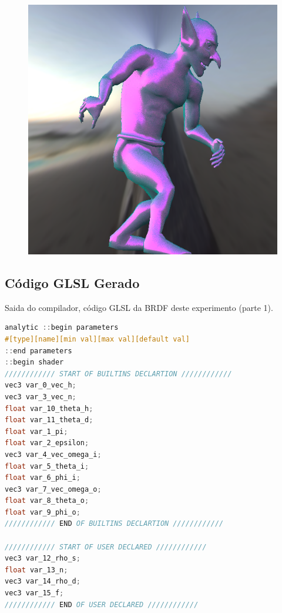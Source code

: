 \begin{figure}[H]
\endminipage\hfill
{}%
  \includegraphics[width=\linewidth]{./Imagens/brdfs/blinn-phong-goblin.png}
\endminipage
\end{figure}

\subsection{Código GLSL Gerado}
\begin{codigo}[H]
    \caption{\small Saida do compilador, código GLSL da BRDF deste experimento (parte 1). }
    \label{cod-blinn-phong-glsl-pt-1}
\begin{lstlisting}[language=C, inputencoding=utf8]
analytic ::begin parameters
#[type][name][min val][max val][default val]
::end parameters
::begin shader
//////////// START OF BUILTINS DECLARTION ////////////
vec3 var_0_vec_h;
vec3 var_3_vec_n;
float var_10_theta_h;
float var_11_theta_d;
float var_1_pi;
float var_2_epsilon;
vec3 var_4_vec_omega_i;
float var_5_theta_i;
float var_6_phi_i;
vec3 var_7_vec_omega_o;
float var_8_theta_o;
float var_9_phi_o;
//////////// END OF BUILTINS DECLARTION ////////////

//////////// START OF USER DECLARED ////////////
vec3 var_12_rho_s;
float var_13_n;
vec3 var_14_rho_d;
vec3 var_15_f;
//////////// END OF USER DECLARED ////////////
\end{lstlisting}
\end{codigo}

